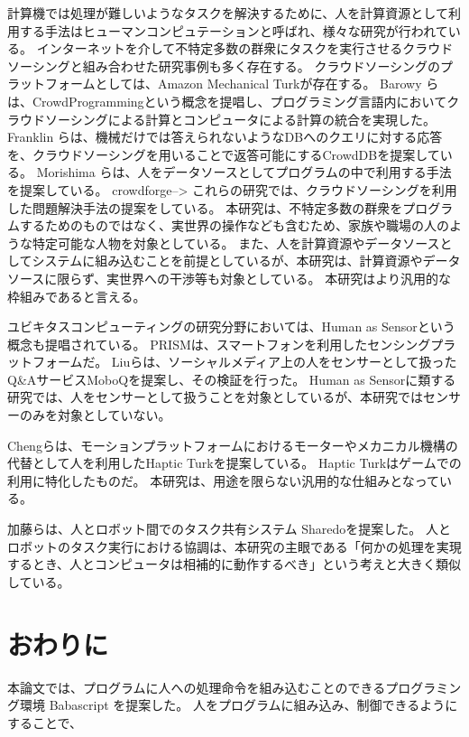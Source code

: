 \documentclass[twoside]{wiss}
\begin{document}
計算機では処理が難しいようなタスクを解決するために、人を計算資源として利用する手法はヒューマンコンピュテーション\cite{humancomputation}と呼ばれ、様々な研究が行われている。
インターネットを介して不特定多数の群衆にタスクを実行させるクラウドソーシングと組み合わせた研究事例も多く存在する。
クラウドソーシングのプラットフォームとしては、Amazon Mechanical Turk\cite{mechanicalturk}が存在する。
Barowy らは、CrowdProgrammingという概念を提唱し、プログラミング言語内においてクラウドソーシングによる計算とコンピュータによる計算の統合を実現した\cite{automan}。
Franklin らは、機械だけでは答えられないようなDBへのクエリに対する応答を、クラウドソーシングを用いることで返答可能にするCrowdDBを提案している\cite{crowddb}。
Morishima らは、人をデータソースとしてプログラムの中で利用する手法を提案している\cite{cylog}。
crowdforge-->
これらの研究では、クラウドソーシングを利用した問題解決手法の提案をしている。
本研究は、不特定多数の群衆をプログラムするためのものではなく、実世界の操作なども含むため、家族や職場の人のような特定可能な人物を対象としている。
また、人を計算資源やデータソースとしてシステムに組み込むことを前提としているが、本研究は、計算資源やデータソースに限らず、実世界への干渉等も対象としている。
本研究はより汎用的な枠組みであると言える。

ユビキタスコンピューティングの研究分野においては、Human as Sensorという概念も提唱されている。
PRISMは、スマートフォンを利用したセンシングプラットフォームだ\cite{prism}。
Liuらは、ソーシャルメディア上の人をセンサーとして扱ったQ\&AサービスMoboQを提案し、その検証を行った。
Human as Sensorに類する研究では、人をセンサーとして扱うことを対象としているが、本研究ではセンサーのみを対象としていない。

Chengらは、モーションプラットフォームにおけるモーターやメカニカル機構の代替として人を利用したHaptic Turkを提案している\cite{hapticturk}。
Haptic Turkはゲームでの利用に特化したものだ。
本研究は、用途を限らない汎用的な仕組みとなっている。

加藤らは、人とロボット間でのタスク共有システム Sharedoを提案した\cite{sharedo}。
人とロボットのタスク実行における協調は、本研究の主眼である「何かの処理を実現するとき、人とコンピュータは相補的に動作するべき」という考えと大きく類似している。


\section{おわりに}

本論文では、プログラムに人への処理命令を組み込むことのできるプログラミング環境 Babascript を提案した。
人をプログラムに組み込み、制御できるようにすることで、
\end{document}
